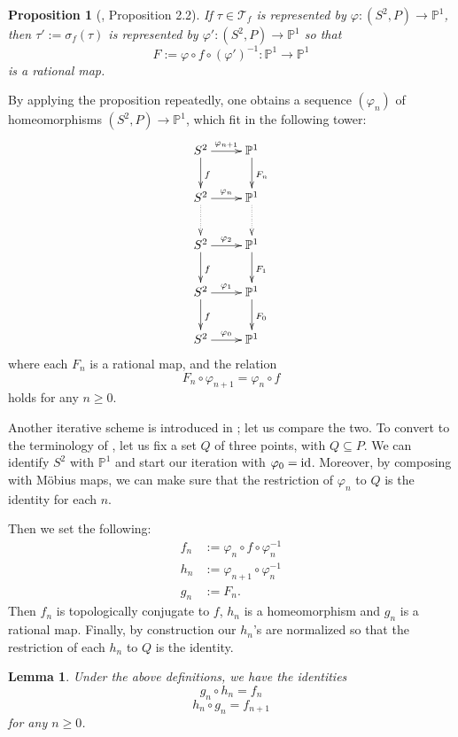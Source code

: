 \documentclass[11pt]{amsart}
\newtheorem{lemma}[theorem]{Lemma}
\newtheorem{proposition}[theorem]{Proposition}
\begin{document}
\begin{proposition}[\cite{DH}, Proposition 2.2]
If $\tau \in \mathcal{T}_f$ is represented by $\varphi : (S^2, P) \to \mathbb{P}^1$, then $\tau' := \sigma_f(\tau)$ is represented by $\varphi': (S^2, P) \to \mathbb{P}^1$ so that 
$$F := \varphi \circ f \circ (\varphi')^{-1} : \mathbb{P}^1 \to \mathbb{P}^1$$
is a rational map. 
\end{proposition}

By applying the proposition repeatedly, one obtains a sequence $(\varphi_n)$ of homeomorphisms $(S^2, P) \to \mathbb{P}^1$, which fit in the following tower: 
$$\xymatrix{
S^2 \ar[r]^{\varphi_{n+1}}  \ar[d]^f & \mathbb{P}^1 \ar[d]^{F_n} \\
S^2 \ar[r]^{\varphi_{n}}  \ar@{..>}[d] & \mathbb{P}^1 \ar@{..>}[d] \\
S^2 \ar[r]^{\varphi_2}  \ar[d]^f & \mathbb{P}^1 \ar[d]^{F_1} \\
S^2 \ar[r]^{\varphi_1}  \ar[d]^f & \mathbb{P}^1 \ar[d]^{F_0} \\
S^2 \ar[r]^{\varphi_0}  & \mathbb{P}^1  
}$$
where each $F_n$ is a rational map, and the relation 
\begin{equation} \label{E:th1}
F_{n} \circ \varphi_{n+1} = \varphi_n \circ f
\end{equation}
holds for any $n \geq 0$. 

\bigskip
Another iterative scheme is introduced in \cite{Mil}; let us compare the two. 
To convert to the terminology of \cite{Mil}, let us fix a set $Q$ of three points, with $Q \subseteq P$. 
We can identify $S^2$ with $\mathbb{P}^1$ and start our iteration with $\varphi_0 = \textup{id}$. 
Moreover, by composing with M\"obius maps, we can make sure that the restriction of $\varphi_n$
to $Q$ is the identity for each $n$.

Then we set the following: 
\begin{align}
f_n & := \varphi_n \circ f \circ \varphi_n^{-1} \label{E:1} \\
h_n & := \varphi_{n+1} \circ \varphi_n^{-1}  \label{E:2} \\
g_n & := F_n.
\end{align}
Then $f_n$ is topologically conjugate to $f$, $h_n$ is a homeomorphism and $g_n$ is a rational map. 
Finally, by construction our $h_n$'s are normalized so that the restriction of each $h_n$ to $Q$ is the identity.

\begin{lemma}
Under the above definitions, we have the identities
$$g_n \circ h_n = f_n$$
$$h_n \circ g_n = f_{n+1}$$
for any $n \geq 0$. 
\end{lemma}
\end{document}
